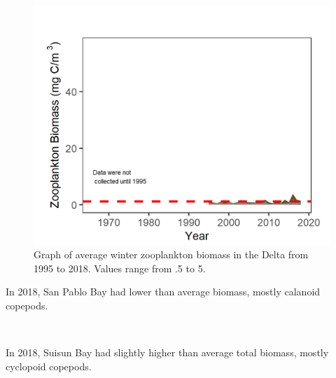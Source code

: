 \documentclass[
]{book}
\begin{document}
\begin{panel-grid}
\begin{columns-nocenter}
\begin{column800}
\begin{expand}
\begin{figure}
\includegraphics[width=15.25in]{figures/zoops_dtwinter} \caption{Graph of average winter zooplankton biomass in the Delta from 1995 to 2018. Values range from .5 to 5.}\label{fig:unnamed-chunk-167}
\end{figure}

\end{expand}

\end{column800}

\end{columns-nocenter}

\begin{columns-nocenter}

\begin{column800}

In 2018, San Pablo Bay had lower than average biomass, mostly calanoid copepods.

\end{column800}

\begin{column40}

~

\end{column40}

\begin{column800}

In 2018, Suisun Bay had slightly higher than average total biomass, mostly cyclopoid copepods.

\end{column800}


\end{columns-nocenter}
\end{panel-grid}
\end{document}
